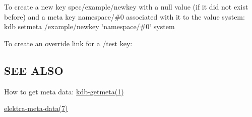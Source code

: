To create a new key {\ttfamily spec/example/newkey} with a null value (if it did not exist before) and a meta key {\ttfamily namespace/\#0} associated with it to the value {\ttfamily system}\+: {\ttfamily kdb setmeta /example/newkey \char`\"{}namespace/\#0\char`\"{} system}

To create an override link for a {\ttfamily /test} key\+: 


\subsection*{S\+E\+E A\+L\+S\+O}


\begin{DoxyItemize}
\item How to get meta data\+: \hyperlink{md_doc_help_kdb-getmeta_doc_help_kdb-getmeta_md}{kdb-\/getmeta(1)}
\item \hyperlink{md_doc_help_elektra-meta-data_doc_help_elektra-meta-data_md}{elektra-\/meta-\/data(7)} 
\end{DoxyItemize}